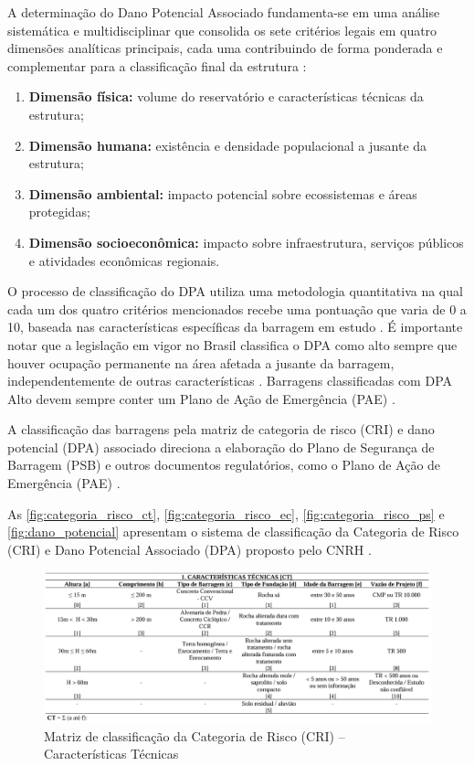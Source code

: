 A determinação do Dano Potencial Associado fundamenta-se em uma análise sistemática e multidisciplinar que consolida os sete critérios legais em quatro dimensões analíticas principais, cada uma contribuindo de forma ponderada e complementar para a classificação final da estrutura \cite{brasil2010pnsb,carneiro2018,geoscan2020}:

\begin{enumerate}
    \item \textbf{Dimensão física:} volume do reservatório e características técnicas da estrutura;
    \item \textbf{Dimensão humana:} existência e densidade populacional a jusante da estrutura;
    \item \textbf{Dimensão ambiental:} impacto potencial sobre ecossistemas e áreas protegidas;
    \item \textbf{Dimensão socioeconômica:} impacto sobre infraestrutura, serviços públicos e atividades econômicas regionais.
\end{enumerate}

O processo de classificação do \textsc{DPA} utiliza uma metodologia quantitativa na qual cada um dos quatro critérios mencionados recebe uma pontuação que varia de 0 a 10, baseada nas características específicas da barragem em estudo \cite{brasil2010pnsb,carneiro2018}. É importante notar que a legislação em vigor no Brasil classifica o \textsc{DPA} como alto sempre que houver ocupação permanente na área afetada a jusante da barragem, independentemente de outras características \cite{moecke2019}. Barragens classificadas com \textsc{DPA} Alto devem sempre conter um Plano de Ação de Emergência (\textsc{PAE}) \cite{freire2020}.

A classificação das barragens pela matriz de categoria de risco (\textsc{CRI}) e dano potencial (\textsc{DPA}) associado direciona a elaboração do Plano de Segurança de Barragem (PSB) e outros documentos regulatórios, como o Plano de Ação de Emergência (\textsc{PAE}) \cite{moecke2019}.

As \autoref{fig:categoria_risco_ct}, \autoref{fig:categoria_risco_ec}, \autoref{fig:categoria_risco_ps} e \autoref{fig:dano_potencial} apresentam o sistema de classificação da Categoria de Risco (CRI) e Dano Potencial Associado (DPA) proposto pelo CNRH \cite{cnrh2012}.

\begin{figure}[htbp]
    \centering
    \includegraphics[width=\textwidth]{figures/image22_categoria_de_risco_ct.png}
    \caption{Matriz de classificação da Categoria de Risco (CRI) -- Características Técnicas}
    \label{fig:categoria_risco_ct}
\end{figure}

